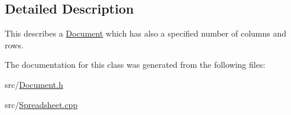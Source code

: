 \subsection{Detailed Description}
This describes a \hyperlink{classdocs_1_1Document}{Document} which has also a specified number of columns and rows. 

The documentation for this class was generated from the following files\-:\begin{DoxyCompactItemize}
\item 
src/\hyperlink{Document_8h}{Document.\-h}\item 
src/\hyperlink{Spreadsheet_8cpp}{Spreadsheet.\-cpp}\end{DoxyCompactItemize}
